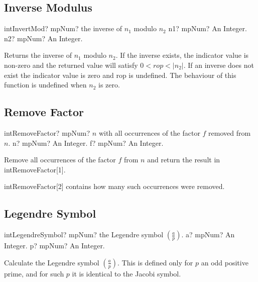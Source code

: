 \subsection{Inverse Modulus}

\begin{mpFunctionsExtract}
	\mpFunctionTwo
	{intInvertMod? mpNum? the inverse of $n_1$ modulo $n_2$}
	{n1? mpNum? An Integer.}
	{n2? mpNum? An Integer.}
\end{mpFunctionsExtract}

\vspace{0.3cm}
Returns the inverse of $n_1$ modulo $n_2$. If the inverse exists, the indicator value is non-zero and the returned value will satisfy $0 < rop < |n_2|$. If an inverse does not exist the
indicator value is zero and rop is undefined. The behaviour of this function is undefined when
$n_2$ is zero.


\subsection{Remove Factor}

\begin{mpFunctionsExtract}
	\mpFunctionTwo
	{intRemoveFactor? mpNum? $n$ with all occurrences of the factor $f$ removed from $n$.}
	{n? mpNum? An Integer.}
	{f? mpNum? An Integer.}
\end{mpFunctionsExtract}

\vspace{0.3cm}
Remove all occurrences of the factor $f$ from $n$ and return the result in \textsf{intRemoveFactor}[1]. 

\textsf{intRemoveFactor}[2] contains how many such occurrences were removed.




\subsection{Legendre Symbol}

\begin{mpFunctionsExtract}
	\mpFunctionTwo
	{intLegendreSymbol? mpNum? the Legendre symbol $\left(\frac{a}{p}\right)$.}
	{a? mpNum? An Integer.}
	{p? mpNum? An Integer.}
\end{mpFunctionsExtract}

\vspace{0.3cm}
Calculate the Legendre symbol $\left(\frac{a}{p}\right)$. This is defined only for $p$ an odd positive prime, and for such $p$ it is identical to the Jacobi symbol.





